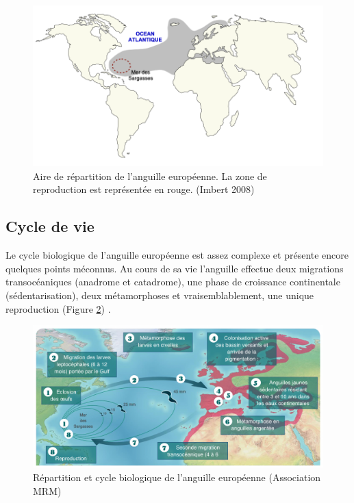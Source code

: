 \documentclass[11pt,titlepage,twoside]{article}\usepackage[]{graphicx}\usepackage[table]{xcolor}
\begin{document}
\begin{figure}[htpb]
\centering
\includegraphics[width=\textwidth]{Aire}
\caption{Aire de répartition de l'anguille européenne. La zone de reproduction est représentée en rouge. (Imbert 2008)}
\label{Aire}
\end{figure}


\subsection{Cycle de vie}

Le cycle biologique de l’anguille européenne est assez complexe et présente encore quelques points méconnus. Au cours de sa vie l’anguille effectue deux migrations transocéaniques (anadrome et catadrome), une phase de croissance continentale (sédentarisation), deux métamorphoses et vraisemblablement, une unique reproduction (Figure \ref{Cycle}) \citep{anthony_bases_2006}. 

\begin{figure}[htpb]
\centering
\includegraphics[width=\textwidth]{Cycle}
\caption{Répartition et cycle biologique de l'anguille européenne (Association MRM)}
\label{Cycle}
\end{figure}
\end{document}
